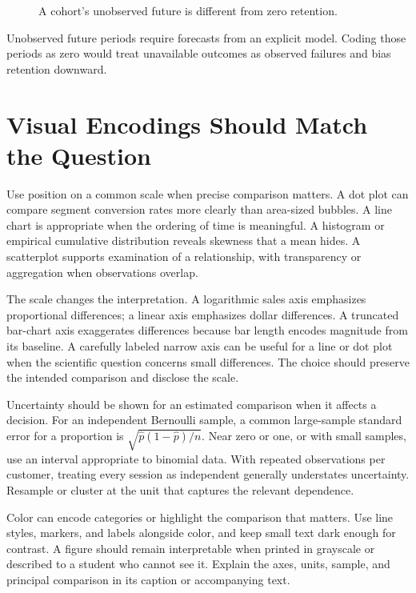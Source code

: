 \begin{figure}[htbp]
\centering

\caption{A cohort’s unobserved future is different from zero retention.}\label{fig:M02_cohort_triangle}
\end{figure}

Unobserved future periods require forecasts from an explicit model.
Coding those periods as zero would treat unavailable outcomes as
observed failures and bias retention downward.

\hypertarget{M02-visual-encodings-should-match-the-question}{%
\section{Visual Encodings Should Match the
Question}\label{M02-visual-encodings-should-match-the-question}}

\noindent Use position on a common scale when precise comparison matters. A dot
plot can compare segment conversion rates more clearly than area-sized
bubbles. A line chart is appropriate when the ordering of time is
meaningful. A histogram or empirical cumulative distribution reveals
skewness that a mean hides. A scatterplot supports examination of a
relationship, with transparency or aggregation when observations
overlap.

The scale changes the interpretation. A logarithmic sales axis
emphasizes proportional differences; a linear axis emphasizes dollar
differences. A truncated bar-chart axis exaggerates differences because
bar length encodes magnitude from its baseline. A carefully labeled
narrow axis can be useful for a line or dot plot when the scientific
question concerns small differences. The choice should preserve the
intended comparison and disclose the scale.

Uncertainty should be shown for an estimated comparison when it affects
a decision. For an independent Bernoulli sample, a common large-sample
standard error for a proportion is \(\sqrt{\hat p(1-\hat p)/n}\). Near
zero or one, or with small samples, use an interval appropriate to
binomial data. With repeated observations per customer, treating every
session as independent generally understates uncertainty. Resample or
cluster at the unit that captures the relevant dependence.

Color can encode categories or highlight the comparison that matters.
Use line styles, markers, and labels alongside color, and keep small
text dark enough for contrast. A figure should remain interpretable when
printed in grayscale or described to a student who cannot see it.
Explain the axes, units, sample, and principal comparison in its caption
or accompanying text.

